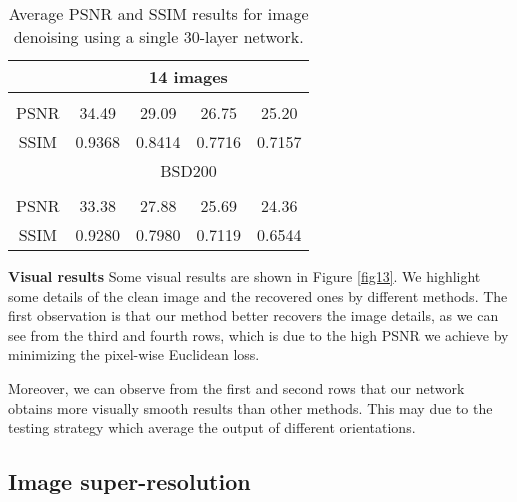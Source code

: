 \documentclass[10pt,journal,compsoc]{IEEEtran}
\begin{document}
\begin{table}[b!]
\centering
\caption{Average PSNR and SSIM results for image denoising using a single 30-layer network.}
\begin{tabular}{ c|c c c c } \hline
       &\multicolumn{4}{c}{14 images}                     \\ \hline
       & & & & \\ \hline
  PSNR &34.49       &29.09       &26.75       &25.20       \\ \hline
  SSIM &0.9368      &0.8414      &0.7716      &0.7157      \\ \hline
     &\multicolumn{4}{c}{BSD200}                          \\ \hline
       & & & & \\ \hline
  PSNR &33.38       &27.88       &25.69       &24.36       \\ \hline
  SSIM &0.9280      &0.7980      &0.7119      &0.6544      \\ \hline
\end{tabular}
\label{table4}
\end{table}

{\bf{Visual results}} Some visual results are shown in Figure \ref{fig13}. We highlight
some details of the clean image and the recovered ones by different methods. The first
observation is that our method better recovers the image details, as we can see from the
third and fourth rows, which is due to the high PSNR we achieve by minimizing the pixel-wise
Euclidean loss.

 Moreover, we can observe from the first and second rows that our network
obtains more visually smooth results than other methods. This may due to the testing
strategy which average the output of different orientations.

\begin{figure*}
\centering
\subfigure{\texttt{[image: 30-1]} }
\subfigure{\texttt{[image: 30-2]} }
\subfigure{\texttt{[image: 50-1]} }
\subfigure{\texttt{[image: 50-2]} }
\caption{Visual results of image denoising. Images from left to right column are:
clean image; the recovered image of RED30, BM3D, EPLL, NCSR, PCLR, PGPD, WNNM.}
\label{fig13}
\end{figure*}





\subsection{Image super-resolution}
\end{document}
